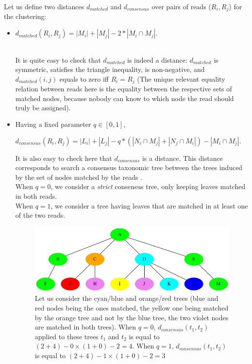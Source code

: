 \documentclass{report}
\begin{document}
Let us define two distances $d_{matched}$ and $d_{consensus}$ over pairs of reads ($R_{i},R_{j}$) for the clustering:
       \begin{itemize} 
       \item \begin{center} $d_{matched}(R_{i},R_{j}) = |M_{i}| + |M_{j}| - 2*|M_{i} \cap M_{j}|$. \end{center}\\ 

It is quite easy to check that $d_{matched}$ is indeed a distance: $d_{matched}$ is symmetric, satisfies the triangle inequality, is non-negative, and $d_{matched}(i,j)$ equals to zero iff $R_{i} = R_{j}$ (The unique relevant equality relation between reads here is the equality between the respective sets of matched nodes, because nobody can know to which node the read should truly be assigned).
       \item Having a fixed parameter $q \in [0,1]$,\\
\begin{center}
$d_{consensus}(R_{i},R_{j}) = |L_{i}| + |L_{j}| - q*(|N_{i}\cap M_{j}| + |N_{j} \cap M_{i}|) - |M_{i} \cap M_{j}|$.\\
\end{center}

It is also easy to check here that $d_{consensus}$ is a distance. This distance corresponds to search a consensus taxonomic tree between the trees induced by the set of nodes matched by the reads \cite{Consensus}.\\

When $q = 0$, we consider a \emph{strict} consensus tree, only keeping leaves matched in both reads.\\
When $q = 1$, we consider a tree having leaves that are matched in at least one of the two reads.

\begin{figure}[H]
\centering
\includegraphics[scale=0.5]{illustrations/distance2.png}
\caption{Let us consider the cyan/blue and orange/red trees (blue and red nodes being the ones matched, the yellow one being matched by the orange tree and not by the blue tree, the two violet nodes are matched in both trees). When $q = 0$, $d_{consensus}(t_{1},t_{2})$ applied to these trees $t_{1}$ and $t_{2}$ is equal to $(2 + 4) - 0 \times (1 + 0) - 2 = 4$. When $q = 1$, $d_{consensus}(t_{1},t_{2})$ is equal to $(2 + 4) - 1 \times (1 + 0) - 2 = 3$}
\end{figure}

       \end{itemize}
\end{document}
